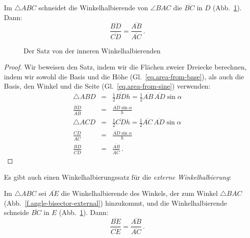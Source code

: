 \begin{theorem}\label{thm.angle-bisector}
Im $\triangle ABC$ schneidet die Winkelhalbierende von $\angle BAC$ die $\overline{BC}$ in $D$ (Abb.~\ref{f.angle-bisector}). Dann:
\[
\frac {\overline{BD}}{\overline{CD}}=\frac {\overline{AB}}{\overline{AC}}\,.
\]
\end{theorem}

\begin{figure}[b]
\begin{center}
\end{center}
\caption{Der Satz von der inneren Winkelhalbierenden}\label{f.angle-bisector}
\end{figure}
\begin{proof}
Wir beweisen den Satz, indem wir die Flächen zweier Dreiecke berechnen, indem wir sowohl die Basis und die Höhe (Gl.~\ref{eq.area-from-base}), als auch die Basis, den Winkel und die Seite (Gl.~\ref{eq.area-from-sine}) verwenden:
\begin{eqnarray*}
\triangle ABD&=&\frac{1}{2}\overline{BD}h=\frac{1}{2}\overline{AB}\,\overline{AD}\sin \alpha\\
\frac{\overline{BD}}{\overline{AB}}&=&\frac{\overline{AD}\sin \alpha}{h}\\
\triangle ACD&=&\frac{1}{2}\overline{CD}h=\frac{1}{2}\overline{AC}\,\overline{AD}\sin \alpha\\
\frac{\overline{CD}}{\overline{AC}}&=&\frac{\overline{AD}\sin \alpha}{h}\\
\frac{\overline{BD}}{\overline{CD}}&=&\frac{\overline{AB}}{\overline{AC}}\,.
\end{eqnarray*}
\end{proof}
Es gibt auch einen Winkelhalbierungssatz für die \emph{externe Winkelhalbierung}:
\begin{theorem}\label{thm.external-angle-bisector}
Im $\triangle ABC$ sei $\overline{AE}$ die Winkelhalbierende des Winkels, der zum Winkel $\triangle BAC$ (Abb.~\ref{f.angle-bisector-external}) hinzukommt, und die Winkelhalbierende schneide $\overline{BC}$ in $E$ (Abb.~\ref{f.angle-bisector}). Dann:
\[
\frac {\overline{BE}}{\overline{CE}}=\frac {\overline{AB}}{\overline{AC}}\,.
\]
\end{theorem}

